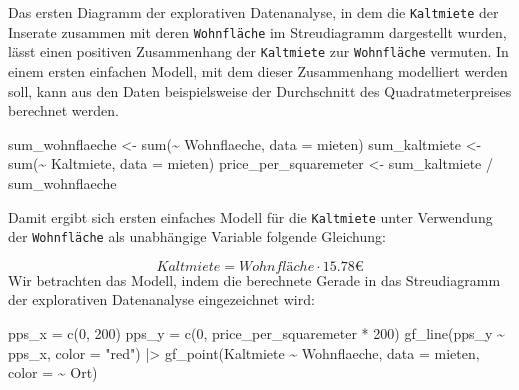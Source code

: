 \documentclass[
  a4paper,
  DIV=11]{scrartcl}
\newenvironment{Shaded}{\begin{snugshade}}{\end{snugshade}}
\newcommand{\AttributeTok}[1]{\textcolor[rgb]{0.40,0.45,0.13}{#1}}
\newcommand{\DecValTok}[1]{\textcolor[rgb]{0.68,0.00,0.00}{#1}}
\newcommand{\FunctionTok}[1]{\textcolor[rgb]{0.28,0.35,0.67}{#1}}
\newcommand{\NormalTok}[1]{\textcolor[rgb]{0.00,0.23,0.31}{#1}}
\newcommand{\OtherTok}[1]{\textcolor[rgb]{0.00,0.23,0.31}{#1}}
\newcommand{\SpecialCharTok}[1]{\textcolor[rgb]{0.37,0.37,0.37}{#1}}
\newcommand{\StringTok}[1]{\textcolor[rgb]{0.13,0.47,0.30}{#1}}
\begin{document}
Das ersten Diagramm der explorativen Datenanalyse, in dem die
\texttt{Kaltmiete} der Inserate zusammen mit deren \texttt{Wohnfläche}
im Streudiagramm dargestellt wurden, lässt einen positiven Zusammenhang
der \texttt{Kaltmiete} zur \texttt{Wohnfläche} vermuten. In einem ersten
einfachen Modell, mit dem dieser Zusammenhang modelliert werden soll,
kann aus den Daten beispielsweise der Durchschnitt des
Quadratmeterpreises berechnet werden.

\begin{Shaded}
\begin{Highlighting}[]
\NormalTok{sum\_wohnflaeche }\OtherTok{\textless{}{-}} \FunctionTok{sum}\NormalTok{(}\SpecialCharTok{\textasciitilde{}}\NormalTok{ Wohnflaeche, }\AttributeTok{data =}\NormalTok{ mieten)}
\NormalTok{sum\_kaltmiete }\OtherTok{\textless{}{-}} \FunctionTok{sum}\NormalTok{(}\SpecialCharTok{\textasciitilde{}}\NormalTok{ Kaltmiete, }\AttributeTok{data =}\NormalTok{ mieten)}
\NormalTok{price\_per\_squaremeter }\OtherTok{\textless{}{-}}\NormalTok{ sum\_kaltmiete }\SpecialCharTok{/}\NormalTok{ sum\_wohnflaeche}
\end{Highlighting}
\end{Shaded}

Damit ergibt sich ersten einfaches Modell für die \texttt{Kaltmiete}
unter Verwendung der \texttt{Wohnfläche} als unabhängige Variable
folgende Gleichung:

\[ Kaltmiete = Wohnfläche \cdot 15.78 € \] Wir betrachten das Modell,
indem die berechnete Gerade in das Streudiagramm der explorativen
Datenanalyse eingezeichnet wird:

\begin{Shaded}
\begin{Highlighting}[]
\NormalTok{pps\_x }\OtherTok{=} \FunctionTok{c}\NormalTok{(}\DecValTok{0}\NormalTok{, }\DecValTok{200}\NormalTok{)}
\NormalTok{pps\_y }\OtherTok{=} \FunctionTok{c}\NormalTok{(}\DecValTok{0}\NormalTok{, price\_per\_squaremeter }\SpecialCharTok{*} \DecValTok{200}\NormalTok{)}
\FunctionTok{gf\_line}\NormalTok{(pps\_y }\SpecialCharTok{\textasciitilde{}}\NormalTok{ pps\_x, }\AttributeTok{color =} \StringTok{"red"}\NormalTok{) }\SpecialCharTok{|\textgreater{}} \FunctionTok{gf\_point}\NormalTok{(Kaltmiete }\SpecialCharTok{\textasciitilde{}}\NormalTok{ Wohnflaeche, }\AttributeTok{data =}\NormalTok{ mieten, }\AttributeTok{color =} \SpecialCharTok{\textasciitilde{}}\NormalTok{ Ort)}
\end{Highlighting}
\end{Shaded}
\end{document}
